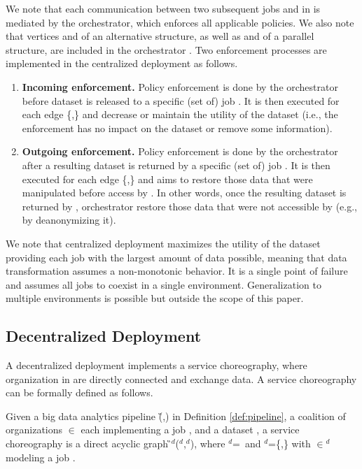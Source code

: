 We note that each communication between two subsequent jobs  and  in \coalition{} is mediated by the orchestrator, which enforces all applicable policies. We also note that vertices  and  of an alternative structure, as well as  and  of a parallel structure, are included in the orchestrator \orc{}. Two enforcement processes are implemented in the centralized deployment as follows.
\begin{enumerate}
    \item \textbf{Incoming enforcement.} Policy enforcement is done by the orchestrator before dataset \dataset{} is released to a specific (set of) job . It is then executed for each edge \{\orc{},\} and decrease or maintain the utility of the dataset (i.e., the enforcement has no impact on the dataset or remove some information).
    \item \textbf{Outgoing enforcement.} Policy enforcement is done by the orchestrator after a resulting dataset \dataset{} is returned by a specific (set of) job . It is then executed for each edge \{,\orc{}\} and aims to restore those data that were manipulated before access by . In other words, once the resulting dataset is returned by , orchestrator \orc{} restore those data that were not accessible by  (e.g., by deanonymizing it).
\end{enumerate}

We note that centralized deployment maximizes the utility of the dataset providing each job with the largest amount of data possible, meaning that data transformation assumes a non-monotonic behavior. It is a single point of failure and assumes all jobs to coexist in a single environment. Generalization to multiple environments is possible but outside the scope of this paper.

\subsection{Decentralized Deployment}\label{sec:decentralized}
A decentralized deployment implements a service choreography, where organization  in \coalition{} are directly connected and exchange data. A service choreography can be formally defined as follows.

\begin{definition}\label{def:choreography}
    Given a big data analytics pipeline \G(\V,\E) in Definition \ref{def:pipeline}, a coalition \coalition{} of organizations $\in$\Org{} each implementing a job , and a dataset \dataset{}, a service choreography is a direct acyclic graph \G$^d$(\V$^d$,\E$^d$), where \V$^d$=\V\ and \E$^d$=\{,\} with $\in$\V$^d$ modeling a job . 
\end{definition}


